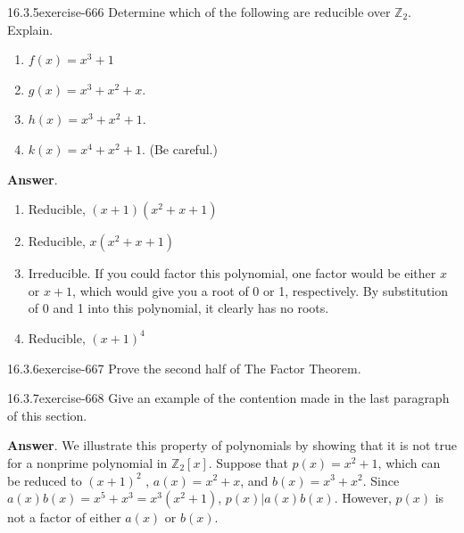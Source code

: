 \documentclass[twoside,10pt,]{book}
\numberwithin{equation}{section}
\begin{document}
\begin{divisionsolution}{16.3.5}{}{exercise-666}%
\hypertarget{p-5986}{}%
Determine which of the following are reducible over \(\mathbb{Z}_2\). Explain.\leavevmode%
\begin{enumerate}[label=(\alph*)]
\item\hypertarget{li-2649}{}\hypertarget{p-5987}{}%
\(f(x) = x^3 + 1\)%
\item\hypertarget{li-2650}{}\hypertarget{p-5988}{}%
\(g(x) = x^3 + x^2 + x\).%
\item\hypertarget{li-2651}{}\hypertarget{p-5989}{}%
\(h(x) = x^3+ x^2 + 1\).%
\item\hypertarget{li-2652}{}\hypertarget{p-5990}{}%
\(k(x) = x^4 +x^2+ 1\). (Be careful.)%
\end{enumerate}
%
\par\smallskip%
\noindent\textbf{Answer}.\quad%
\hypertarget{p-5991}{}%
\leavevmode%
\begin{enumerate}[label=(\alph*)]
\item\hypertarget{li-2653}{}\hypertarget{p-5992}{}%
Reducible, \((x+1)\left(x^2+ x+1\right)\)%
\item\hypertarget{li-2654}{}\hypertarget{p-5993}{}%
Reducible,  \(x\left(x^2+x+1\right)\)%
\item\hypertarget{li-2655}{}\hypertarget{p-5994}{}%
Irreducible. If you could factor this polynomial, one factor would be either \(x\) or \(x + 1\), which would give you a root of 0 or 1, respectively. By substitution of 0 and 1 into this polynomial, it clearly has no roots.%
\item\hypertarget{li-2656}{}\hypertarget{p-5995}{}%
Reducible, \((x+1)^{4 }\)%
\end{enumerate}
%
\end{divisionsolution}%
\begin{divisionsolution}{16.3.6}{}{exercise-667}%
\hypertarget{p-5996}{}%
Prove the second half of The Factor Theorem.%
\end{divisionsolution}%
\begin{divisionsolution}{16.3.7}{}{exercise-668}%
\hypertarget{p-5997}{}%
Give an example of the contention made in the last paragraph of this section.%
\par\smallskip%
\noindent\textbf{Answer}.\quad%
\hypertarget{p-5998}{}%
We illustrate this property of polynomials by showing that it is not true for a nonprime polynomial in \(\mathbb{Z}_2[x]\). Suppose that \(p(x)
= x^2+ 1\), which can be reduced to \((x+1)^2\) , \(a(x) = x^2 + x\), and \(b(x) = x^3 + x^2\). Since \(a(x)b(x) =x^5+x^3= x^3\left(x^2+1\right)\), \(p(x)|a(x)b(x)\). However, \(p(x)\) is not a factor of either \(a(x)\) or \(b(x)\).%
\end{divisionsolution}%
\end{document}
